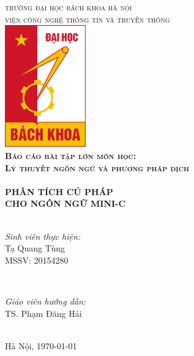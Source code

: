 \documentclass[../report.tex]{subfiles}
\begin{document}
\begin{titlepage}

\center
 
\textsc{\Huge trường đại học bách khoa hà nội}\\[4mm] %
\textsc{\LARGE viện công nghệ thông tin và truyền thông}\\[1cm] %
\includegraphics[width=3.5cm]{figures/hust.jpg}\\[1cm] %
 
\textsc{\LARGE\bfseries Báo cáo bài tập lớn môn học:} \\[0.2cm]
\textsc{\huge\bfseries Lý thuyết ngôn ngữ và phương pháp dịch}\\[1cm] %

\HRule \\[0.4cm]
{\Huge\bfseries PHÂN TÍCH CÚ PHÁP \\ CHO NGÔN NGỮ MINI-C}\\[0.3cm] %
\HRule \\[1.5cm]

\begin{minipage}{0.4\textwidth}
\begin{flushleft} \large
\emph{Sinh viên thực hiện:}\\
Tạ Quang Tùng \\ 
MSSV: 20154280
\end{flushleft}
\end{minipage}
~
\begin{minipage}{0.4\textwidth}
\begin{flushright} \large
\emph{Giáo viên hướng dẫn:} \\
TS. Phạm Đăng Hải
\end{flushright}
\end{minipage}\\[4cm]

{\large Hà Nội, \today}\\[1cm] %

\vfill %

\end{titlepage}
\end{document}
